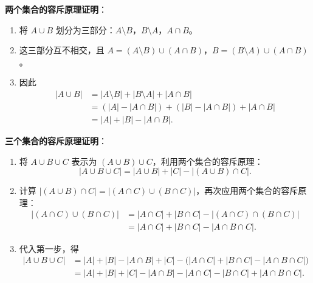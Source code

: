 \begin{proofbox}
\textbf{两个集合的容斥原理证明}：
\begin{enumerate}
    \item 将 $A \cup B$ 划分为三部分：$A \setminus B$，$B \setminus A$，$A \cap B$。
    \item 这三部分互不相交，且 $A = (A \setminus B) \cup (A \cap B)$，$B = (B \setminus A) \cup (A \cap B)$。
    \item 因此
    \begin{align*}
    |A \cup B| &= |A \setminus B| + |B \setminus A| + |A \cap B| \\
    &= (|A| - |A \cap B|) + (|B| - |A \cap B|) + |A \cap B| \\
    &= |A| + |B| - |A \cap B|.
    \end{align*}
\end{enumerate}
\end{proofbox}

\begin{proofbox}
\textbf{三个集合的容斥原理证明}：
\begin{enumerate}
    \item 将 $A \cup B \cup C$ 表示为 $(A \cup B) \cup C$，利用两个集合的容斥原理：
    \[
    |A \cup B \cup C| = |A \cup B| + |C| - |(A \cup B) \cap C|.
    \]
    \item 计算 $|(A \cup B) \cap C| = |(A \cap C) \cup (B \cap C)|$，再次应用两个集合的容斥原理：
    \begin{align*}
    |(A \cap C) \cup (B \cap C)| &= |A \cap C| + |B \cap C| - |(A \cap C) \cap (B \cap C)| \\
    &= |A \cap C| + |B \cap C| - |A \cap B \cap C|.
    \end{align*}
    \item 代入第一步，得
    \begin{align*}
    |A \cup B \cup C| &= |A| + |B| - |A \cap B| + |C| - \bigl(|A \cap C| + |B \cap C| - |A \cap B \cap C|\bigr) \\
    &= |A| + |B| + |C| - |A \cap B| - |A \cap C| - |B \cap C| + |A \cap B \cap C|.
    \end{align*}
\end{enumerate}
\end{proofbox}

